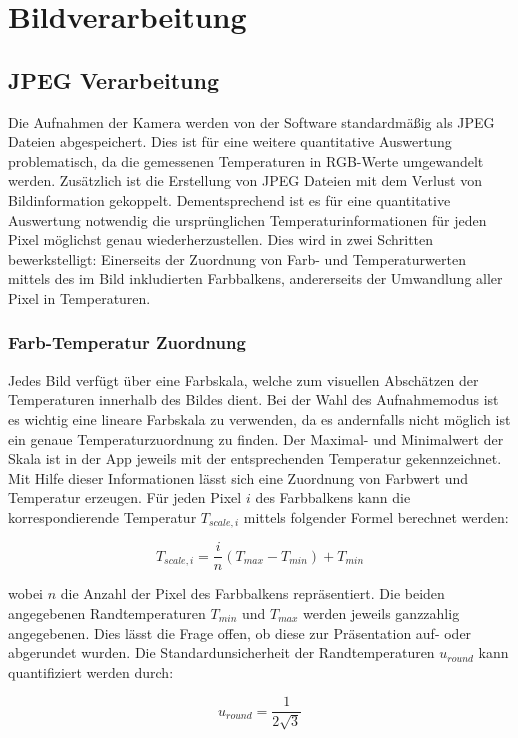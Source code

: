 \documentclass[10pt,a4paper,german]{article}
\begin{document}
\section{Bildverarbeitung}
\subsection{JPEG Verarbeitung}
Die Aufnahmen der Kamera werden von der Software standardmäßig als JPEG Dateien abgespeichert.
Dies ist für eine weitere quantitative Auswertung problematisch, da die gemessenen Temperaturen in RGB-Werte umgewandelt werden.
Zusätzlich ist die Erstellung von JPEG Dateien mit dem Verlust von Bildinformation gekoppelt. 
Dementsprechend ist es für eine quantitative Auswertung notwendig die ursprünglichen Temperaturinformationen für jeden Pixel möglichst genau wiederherzustellen.
Dies wird in zwei Schritten bewerkstelligt:
Einerseits der Zuordnung von Farb- und Temperaturwerten mittels des im Bild inkludierten Farbbalkens, andererseits der Umwandlung aller Pixel in Temperaturen.

\subsubsection{Farb-Temperatur Zuordnung}
Jedes Bild verfügt über eine Farbskala, welche zum visuellen Abschätzen der Temperaturen innerhalb des Bildes dient.
Bei der Wahl des Aufnahmemodus ist es wichtig eine lineare Farbskala zu verwenden, da es andernfalls nicht möglich ist ein genaue Temperaturzuordnung zu finden.
Der Maximal- und Minimalwert der Skala ist in der App jeweils mit der entsprechenden Temperatur gekennzeichnet.
Mit Hilfe dieser Informationen lässt sich eine Zuordnung von Farbwert und Temperatur erzeugen.
Für jeden Pixel $i$ des Farbbalkens kann die korrespondierende Temperatur $T_{scale,i}$ mittels folgender Formel berechnet werden:

\begin{equation}
    T_{scale,i} = \frac{i}{n} \left(T_{max} - T_{min}\right) + T_{min}
\end{equation}

wobei $n$ die Anzahl der Pixel des Farbbalkens repräsentiert.
Die beiden angegebenen Randtemperaturen $T_{min}$ und $T_{max}$ werden jeweils ganzzahlig angegebenen.
Dies lässt die Frage offen, ob diese zur Präsentation auf- oder abgerundet wurden.
Die Standardunsicherheit der Randtemperaturen $u_{round}$ kann quantifiziert werden durch:

\begin{equation}
    u_{round} = \frac{1}{2\sqrt{3}}
\end{equation}
\end{document}
